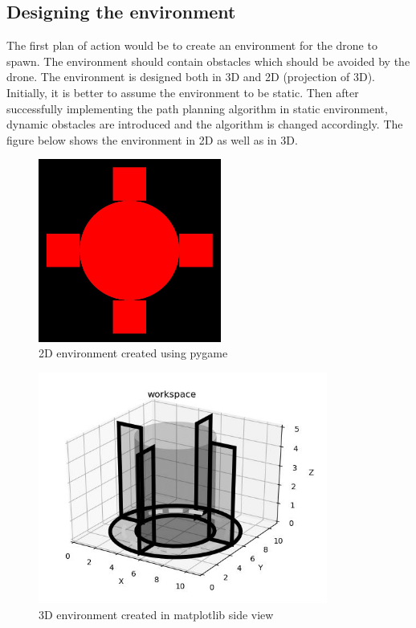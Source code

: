 \documentclass{IEEEtran}
\begin{document}
\subsection{\textbf{Designing the environment}} 
The first plan of action would be to create an environment for the drone to spawn. The environment should contain obstacles which should be avoided by the drone. The environment is designed both in 3D and 2D (projection of 3D). Initially, it is better to assume the environment to be static. Then after successfully implementing the path planning algorithm in static environment, dynamic obstacles are introduced and the algorithm is changed accordingly. The figure below shows the environment in 2D as well as in 3D.
\begin{figure}[h]
    \centering
    \includegraphics[width=6cm]{2dpygame}
    \caption{2D environment created using pygame}
    \label{fig:2D environment created using pygame}
\end{figure}
\begin{figure}[h]
    \centering
    \includegraphics[width=9.5cm]{3dmatplotlib}
    \caption{3D environment created in matplotlib side view}
    \label{fig:3D environment created in matplotlib}
\end{figure}
\end{document}
